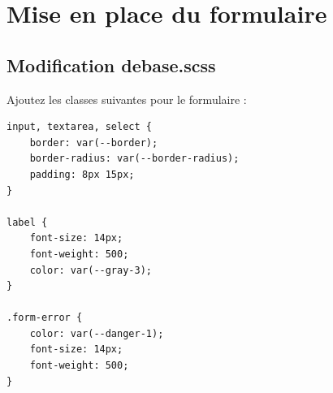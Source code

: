 
\section{Mise en place du formulaire}
\subsection{Modification {\color{monOrange}debase.scss}}
Ajoutez les classes suivantes pour le formulaire :
\begin{verbatim}
input, textarea, select {
    border: var(--border);
    border-radius: var(--border-radius);
    padding: 8px 15px;
}

label {
    font-size: 14px;
    font-weight: 500;
    color: var(--gray-3);
}

.form-error {
    color: var(--danger-1);
    font-size: 14px;
    font-weight: 500;
}
\end{verbatim}
